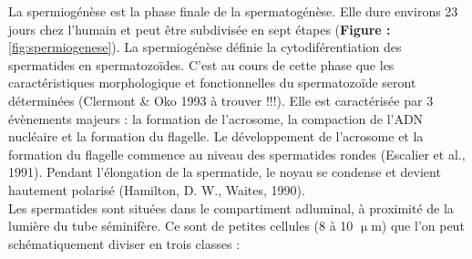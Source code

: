\documentclass[12pt,twoside]{reedthesis}
\theoremstyle{definition}
\theoremstyle{definition}
\theoremstyle{remark}
\begin{document}
  La spermiogénèse est la phase finale de la spermatogénèse. Elle dure
  environs 23 jours chez l'humain et peut être subdivisée en sept étapes
  (\textbf{Figure : }\ref{fig:spermiogenese}). La spermiogénèse définie la
  cytodiférentiation des spermatides en spermatozoïdes. C'est au cours de
  cette phase que les caractéristiques morphologique et fonctionnelles du
  spermatozoïde seront déterminées (Clermont \& Oko 1993 à trouver !!!).
  Elle est caractérisée par 3 évènements majeurs : la formation de
  l'acrosome, la compaction de l'ADN nucléaire et la formation du
  flagelle. Le développement de l'acrosome et la formation du flagelle
  commence au niveau des spermatides rondes (Escalier et al., 1991).
  Pendant l'élongation de la spermatide, le noyau se condense et devient
  hautement polarisé (Hamilton, D. W., Waites, 1990).\\
  Les spermatides sont situées dans le compartiment adluminal, à proximité
  de la lumière du tube séminifère. Ce sont de petites cellules (8 à 10
  \(\upmu\)m) que l'on peut schématiquement diviser en trois classes :
  
\end{document}
